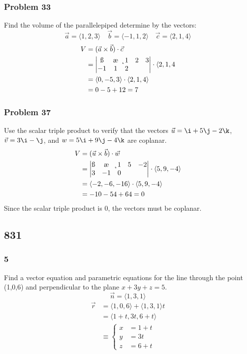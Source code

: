 \documentclass[letterpaper, 12pt]{math}
\begin{document}
\subsubsection*{Problem 33}
Find the volume of the parallelepiped determine by the vectors:
\[ \vec{a} = \langle1,2,3\rangle \quad \vec{b} = \langle-1,1,2\rangle
  \quad \vec{c} = \langle2,1,4\rangle \]
\begin{align*}
  V &= (\vec{a}\times\vec{b})\cdot\vec{c} \\
  &= \begin{vmatrix}
    \i & \j & \k \\
    1 & 2 & 3 \\
    -1 & 1 & 2
  \end{vmatrix}\cdot\langle2,1,4 \\
  &= \langle0,-5,3\rangle\cdot\langle2,1,4\rangle \\
  &= 0-5+12 = 7
\end{align*}

\subsubsection*{Problem 37}
Use the scalar triple product to verify that the vectors \( \vec{u} = \i+5\j-
2\k \), \( \vec{v} = 3\i-\j \), and \( w = 5\i+9\j-4\k \) are coplanar.
\begin{align*}
  V &= (\vec{u}\times\vec{b})\cdot\vec{w} \\
  &= \begin{vmatrix}
    \i & \j & \k \\
    1 & 5 & -2 \\
    3 & -1 & 0
  \end{vmatrix}\cdot\langle5,9,-4\rangle \\
  &= \langle-2,-6,-16\rangle\cdot\langle5,9,-4\rangle \\
  &= -10-54+64 = 0
\end{align*}
Since the scalar triple product is 0, the vectors must be coplanar.

\subsection*{831}

\subsubsection*{5}
Find a vector equation and parametric equations for the line through the
point (1,0,6) and perpendicular to the plane \( x+3y+z = 5 \).
\[ \vec{n} = \langle1,3,1\rangle \]
\begin{align*}
  \vec{r} &= \langle1,0,6\rangle+\langle1,3,1\rangle t \\
  &= \langle1+t,3t,6+t\rangle \\
  &\equiv \begin{cases}
    x &= 1+t \\
    y &= 3t \\
    z &= 6+t
  \end{cases}
\end{align*}
\end{document}
